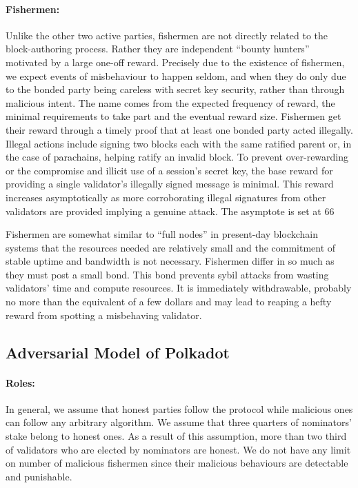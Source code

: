 \paragraph{Fishermen:} \label{par:fishermen} Unlike the other two active parties, fishermen are not directly related to the block-authoring process. Rather they are independent “bounty hunters” motivated by a large one-off reward. Precisely due to
the existence of fishermen, we expect events of misbehaviour to happen seldom, and when they do only due to the bonded party being careless with secret key security, rather than through malicious intent. The name comes from the expected frequency of reward, the minimal requirements to take part and the eventual reward size.
Fishermen get their reward through a timely proof that at least one bonded party acted illegally. Illegal actions include signing two blocks each with the same ratified parent or, in the case of parachains, helping ratify an invalid block. To prevent over-rewarding or the compromise and illicit use of a session’s secret key, the base reward for providing a single validator’s illegally signed message is minimal. This reward increases asymptotically as more corroborating illegal signatures from other validators are provided implying a genuine attack. The asymptote is set at 66 %

Fishermen are somewhat similar to “full nodes” in present-day blockchain systems that the resources needed are relatively small and the commitment of stable uptime and bandwidth is not necessary. Fishermen differ in so much as they must post a small bond. This bond prevents sybil attacks from wasting validators’ time and compute resources. It is immediately withdrawable, probably no more than the equivalent of a few dollars and may lead to reaping a hefty reward from spotting a misbehaving validator.

\subsection{Adversarial Model of Polkadot}

\paragraph{Roles:} In general, we assume that honest parties follow the protocol while malicious ones can follow any arbitrary algorithm. We assume that three quarters of nominators' stake belong to honest ones. As a result of this assumption, more than two third of validators who are elected by nominators are honest. We do not have any limit on number of malicious fishermen since their malicious behaviours are detectable and punishable.  


